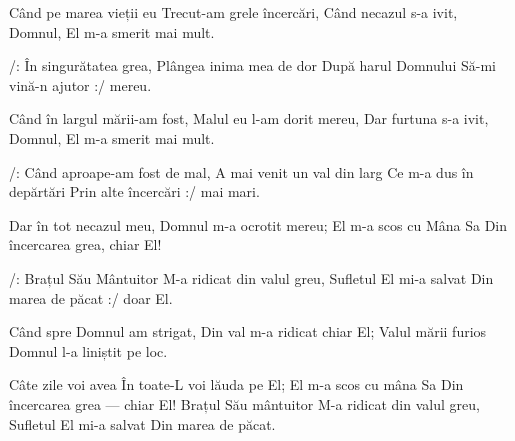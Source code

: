 \beginverse
Când pe marea vieții eu
Trecut-am grele încercări,
Când necazul s-a ivit,
Domnul, El m-a smerit mai mult.
\endverse

\beginchorus
/: În singurătatea grea,
Plângea inima mea de dor
După harul Domnului
Să-mi vină-n ajutor :/ mereu.
\endchorus

\beginverse
Când în largul mării-am fost,
Malul eu l-am dorit mereu,
Dar furtuna s-a ivit,
Domnul, El m-a smerit mai mult.
\endverse

\beginchorus
/: Când aproape-am fost de mal,
A mai venit un val din larg
Ce m-a dus în depărtări
Prin alte încercări :/ mai mari.
\endchorus

\beginverse
Dar în tot necazul meu,
Domnul m-a ocrotit mereu;
El m-a scos cu Mâna Sa
Din încercarea grea, chiar El!
\endverse

\beginchorus
/: Brațul Său Mântuitor
M-a ridicat din valul greu,
Sufletul El mi-a salvat
Din marea de păcat :/ doar El.
\endchorus

\beginverse
Când spre Domnul am strigat,
Din val m-a ridicat chiar El;
Valul mării furios
Domnul l-a liniștit pe loc.
\endverse

\beginchorus
Câte zile voi avea
În toate-L voi lăuda pe El;
El m-a scos cu mâna Sa
Din încercarea grea — chiar El!
Brațul Său mântuitor
M-a ridicat din valul greu,
Sufletul El mi-a salvat
Din marea de păcat.
\endchorus
\endsong